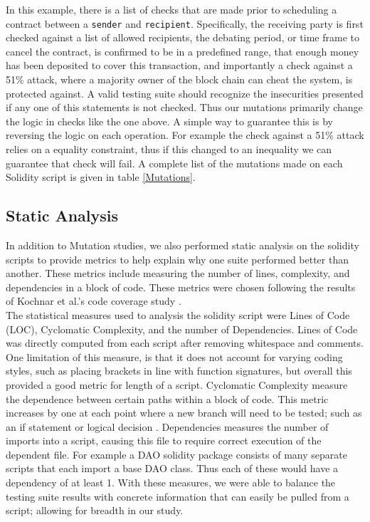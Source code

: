 In this example, there is a list of checks that are made prior to scheduling a contract between a \texttt{sender} and \texttt{recipient}. Specifically, the receiving party is first checked against a list of allowed recipients, the debating period, or time frame to cancel the contract, is confirmed to be in a predefined range, that enough money has been deposited to cover this transaction, and importantly a check against a 51\% attack, where a majority owner of the block chain can cheat the system, is protected against. A valid testing suite should recognize the insecurities presented if any one of this statements is not checked. Thus our mutations primarily change the logic in checks like the one above. A simple way to guarantee this is by reversing the logic on each operation. For example the check against a 51\% attack relies on a equality constraint, thus if this changed to an inequality we can guarantee that check will fail. A complete list of the mutations made on each Solidity script is  given in table \ref{Mutations}. \\
     
\subsection*{Static Analysis}

In addition to Mutation studies, we also performed static analysis on the solidity scripts to provide metrics to help explain why one suite performed better than another. These metrics include measuring the number of lines, complexity, and dependencies in a block of code. These metrics were chosen following the results of Kochnar et al.'s code coverage study \cite{kochhar2017code}. \\

The statistical measures used to analysis the solidity script were Lines of Code (LOC), Cyclomatic Complexity, and the number of Dependencies. Lines of Code was directly computed from each script after removing whitespace and comments. One limitation of this measure, is that it does not account for varying coding styles, such as placing brackets in line with function signatures, but overall this provided a good metric for length of a script. Cyclomatic Complexity measure the dependence between certain paths within a block of code. This metric increases by one at each point where a new branch will need to be tested; such as an if statement or logical decision \cite{mccabe1976complexity}. Dependencies measures the number of imports into a script, causing this file to require correct execution of the dependent file. For example a DAO solidity package consists of many separate scripts that each import a base DAO class. Thus each of these would have a dependency of at least 1. With these measures, we were able to balance the testing suite results with concrete information that can easily be pulled from a script; allowing for breadth in our study. \\


